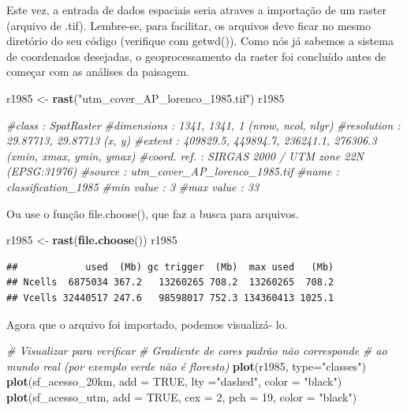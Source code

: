 \documentclass[
]{article}
\newenvironment{Shaded}{\begin{snugshade}}{\end{snugshade}}
\newcommand{\AttributeTok}[1]{\textcolor[rgb]{0.13,0.29,0.53}{#1}}
\newcommand{\CommentTok}[1]{\textcolor[rgb]{0.56,0.35,0.01}{\textit{#1}}}
\newcommand{\ConstantTok}[1]{\textcolor[rgb]{0.56,0.35,0.01}{#1}}
\newcommand{\DecValTok}[1]{\textcolor[rgb]{0.00,0.00,0.81}{#1}}
\newcommand{\FunctionTok}[1]{\textcolor[rgb]{0.13,0.29,0.53}{\textbf{#1}}}
\newcommand{\NormalTok}[1]{#1}
\newcommand{\OtherTok}[1]{\textcolor[rgb]{0.56,0.35,0.01}{#1}}
\newcommand{\StringTok}[1]{\textcolor[rgb]{0.31,0.60,0.02}{#1}}
\begin{document}
Este vez, a entrada de dados espaciais seria atraves a importação de
um raster (arquivo de .tif). Lembre-se, para facilitar, os arquivos deve
ficar no mesmo diretório do seu código
(verifique com getwd()).
Como nós já sabemos a sistema de coordenados desejadas,
o geoprocessamento da raster foi concluído antes de começar com as
análises da paisagem.

\begin{Shaded}
\begin{Highlighting}[]
\NormalTok{r1985 }\OtherTok{\textless{}{-}} \FunctionTok{rast}\NormalTok{(}\StringTok{"utm\_cover\_AP\_lorenco\_1985.tif"}\NormalTok{)}
\NormalTok{r1985}

\CommentTok{\#class       : SpatRaster }
\CommentTok{\#dimensions  : 1341, 1341, 1  (nrow, ncol, nlyr)}
\CommentTok{\#resolution  : 29.87713, 29.87713  (x, y)}
\CommentTok{\#extent      : 409829.5, 449894.7, 236241.1, 276306.3  (xmin, xmax, ymin, ymax)}
\CommentTok{\#coord. ref. : SIRGAS 2000 / UTM zone 22N (EPSG:31976) }
\CommentTok{\#source      : utm\_cover\_AP\_lorenco\_1985.tif }
\CommentTok{\#name        : classification\_1985 }
\CommentTok{\#min value   :                   3 }
\CommentTok{\#max value   :                  33 }
\end{Highlighting}
\end{Shaded}

Ou use o função file.choose(), que faz a busca
para arquivos.

\begin{Shaded}
\begin{Highlighting}[]
\NormalTok{r1985 }\OtherTok{\textless{}{-}} \FunctionTok{rast}\NormalTok{(}\FunctionTok{file.choose}\NormalTok{())}
\NormalTok{r1985}
\end{Highlighting}
\end{Shaded}

\begin{verbatim}
##            used  (Mb) gc trigger  (Mb)  max used   (Mb)
## Ncells  6875034 367.2   13260265 708.2  13260265  708.2
## Vcells 32440517 247.6   98598017 752.3 134360413 1025.1
\end{verbatim}

Agora que o arquivo foi importado, podemos visualizá- lo.

\begin{Shaded}
\begin{Highlighting}[]
\CommentTok{\# Visualizar para verificar}
\CommentTok{\# Gradiente de cores padrão não corresponde }
\CommentTok{\# ao mundo real (por exemplo verde não é floresta)}
\FunctionTok{plot}\NormalTok{(r1985, }\AttributeTok{type=}\StringTok{"classes"}\NormalTok{) }
\FunctionTok{plot}\NormalTok{(sf\_acesso\_20km, }\AttributeTok{add =} \ConstantTok{TRUE}\NormalTok{, }\AttributeTok{lty =}\StringTok{"dashed"}\NormalTok{, }\AttributeTok{color =} \StringTok{"black"}\NormalTok{)}
\FunctionTok{plot}\NormalTok{(sf\_acesso\_utm, }\AttributeTok{add =} \ConstantTok{TRUE}\NormalTok{, }\AttributeTok{cex =} \DecValTok{2}\NormalTok{, }\AttributeTok{pch =} \DecValTok{19}\NormalTok{, }\AttributeTok{color =} \StringTok{"black"}\NormalTok{)}
\end{Highlighting}
\end{Shaded}
\end{document}
